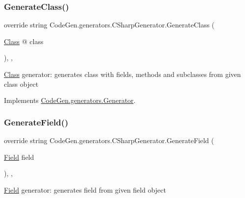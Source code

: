 \subsubsection{\texorpdfstring{Generate\+Class()}{GenerateClass()}}
{\footnotesize\ttfamily override string Code\+Gen.\+generators.\+C\+Sharp\+Generator.\+Generate\+Class (\begin{DoxyParamCaption}\item[{\mbox{\hyperlink{classCodeGen_1_1generators_1_1Class}{Class}} @}]{class }\end{DoxyParamCaption})\hspace{0.3cm}{\ttfamily [inline]}, {\ttfamily [protected]}, {\ttfamily [virtual]}}



\mbox{\hyperlink{classCodeGen_1_1generators_1_1Class}{Class}} generator\+: generates class with fields, methods and subclasses from given class object  



Implements \mbox{\hyperlink{classCodeGen_1_1generators_1_1Generator_a8847fd8b6d408a0dfc087dcc1dc58340}{Code\+Gen.\+generators.\+Generator}}.

\mbox{\label{classCodeGen_1_1generators_1_1CSharpGenerator_a72ff9ea0d6e5119e5a720eb54a952201}} 
\subsubsection{\texorpdfstring{Generate\+Field()}{GenerateField()}}
{\footnotesize\ttfamily override string Code\+Gen.\+generators.\+C\+Sharp\+Generator.\+Generate\+Field (\begin{DoxyParamCaption}\item[{\mbox{\hyperlink{classCodeGen_1_1generators_1_1Field}{Field}}}]{field }\end{DoxyParamCaption})\hspace{0.3cm}{\ttfamily [inline]}, {\ttfamily [protected]}, {\ttfamily [virtual]}}



\mbox{\hyperlink{classCodeGen_1_1generators_1_1Field}{Field}} generator\+: generates field from given field object  




